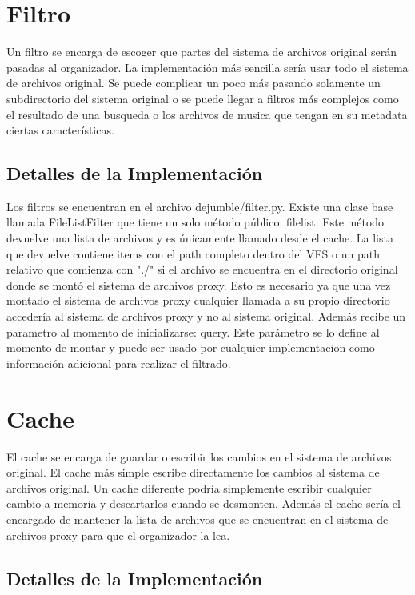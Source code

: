 \section{Filtro}

Un filtro se encarga de escoger que partes del sistema de archivos original serán pasadas al organizador. La implementación más sencilla sería usar todo el sistema de archivos original. Se puede complicar un poco más pasando solamente un subdirectorio del sistema original o se puede llegar a filtros más complejos como el resultado de una busqueda o los archivos de musica que tengan en su metadata ciertas características.

\subsection{Detalles de la Implementación}

Los filtros se encuentran en el archivo dejumble/filter.py. Existe una clase base llamada FileListFilter que tiene un solo método público: filelist. Este método devuelve una lista de archivos y es únicamente llamado desde el cache. La lista que devuelve contiene items con el path completo dentro del VFS o un path relativo que comienza con "./" si el archivo se encuentra en el directorio original donde se montó el sistema de archivos proxy. Esto es necesario ya que una vez montado el sistema de archivos proxy cualquier llamada a su propio directorio accedería al sistema de archivos proxy y no al sistema original. Además recibe un parametro al momento de inicializarse: query. Este parámetro se lo define al momento de montar y puede ser usado por cualquier implementacion como información adicional para realizar el filtrado.


\section{Cache}

El cache se encarga de guardar o escribir los cambios en el sistema de archivos original. El cache más simple escribe directamente los cambios al sistema de archivos original. Un cache diferente podría simplemente escribir cualquier cambio a memoria y descartarlos cuando se desmonten. Además el cache sería el encargado de mantener la lista de archivos que se encuentran en el sistema de archivos proxy para que el organizador la lea.

\subsection{Detalles de la Implementación}

